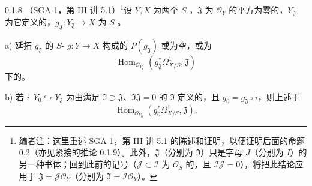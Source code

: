 \begin{SGAresult}{}{0.1.8}
（SGA 1，第 III 讲 5.1）\footnote{编者注：这里重述 SGA 1，第 III 讲 5.1 的陈述和证明，以便证明后面的命题 0.2（亦见紧接的推论 0.1.9）。此外，$\mathfrak J$（分别为 $\mathfrak I$）只是字母 $J$（分别为 $I$）的另一种书体；回到此前的记号（$\mathcal J\subset\mathcal I$ 为 $\mathcal O_S$ 的，且 $\mathcal I\mathcal J=0$），将把此结论应用于 $\mathfrak J=\mathcal J\mathcal O_Y$（分别为 $\mathfrak I=\mathcal I\mathcal O_Y$）。}设 $Y,X$ 为两个 $S$-，$\mathfrak J$ 为 $\mathcal O_Y$ 的平方为零的，$Y_{\mathfrak J}$ 为它定义的，$g_{\mathfrak J}:Y_{\mathfrak J}\to X$ 为 $S$-。

a) 延拓 $g_{\mathfrak J}$ 的 $S$- $g:Y\to X$ 构成的 $P(g_{\mathfrak J})$ 或为空，或为
\[\operatorname{Hom}_{\mathcal O_{Y_{\mathfrak J}}}(g_{\mathfrak J}^*\Omega^1_{X/S},\mathfrak J)\]
下的。

b) 若 $i:Y_0\hookrightarrow Y_{\mathfrak J}$ 为由满足 $\mathfrak I\supset\mathfrak J$、$\mathfrak I\mathfrak J=0$ 的 $\mathfrak I$ 定义的，且 $g_0=g_{\mathfrak J}\circ i$，则上述于
\[\operatorname{Hom}_{\mathcal O_{Y_0}}(g_0^*\Omega^1_{X/S},\mathfrak J).\]
\end{SGAresult}
